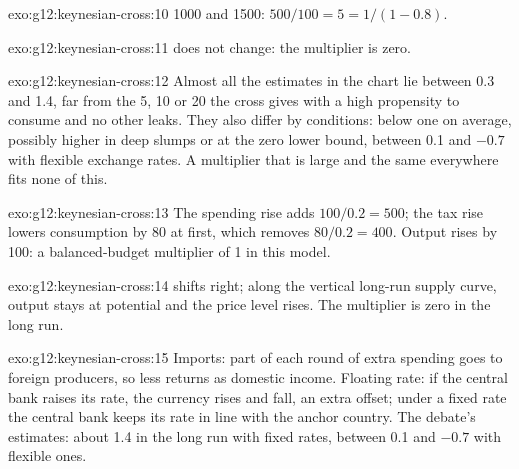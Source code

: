 \begin{solution}{exo:g12:keynesian-cross:10}
1000 and 1500: $500/100 = 5 = 1/(1 - 0.8)$.
\end{solution}

\begin{solution}{exo:g12:keynesian-cross:11}
 does not change: the multiplier is zero.
\end{solution}

\begin{solution}{exo:g12:keynesian-cross:12}
Almost all the estimates in the chart lie between 0.3 and 1.4, far from the 5, 10 or 20 the cross gives with a high propensity to consume and no other leaks. They also
differ by conditions: below one on average, possibly higher in deep slumps or at the zero lower bound, between 0.1 and $-0.7$ with flexible exchange rates. A multiplier
that is large and the same everywhere fits none of this.
\end{solution}

\begin{solution}{exo:g12:keynesian-cross:13}
The spending rise adds $100/0.2 = 500$; the tax rise lowers consumption by 80 at first, which removes $80/0.2 = 400$. Output rises by 100: a balanced-budget multiplier of 1
in this model.
\end{solution}

\begin{solution}{exo:g12:keynesian-cross:14}
 shifts right; along the vertical long-run supply curve, output stays at potential and the price level rises. The multiplier is zero in the long run.
\end{solution}

\begin{solution}{exo:g12:keynesian-cross:15}
Imports: part of each round of extra spending goes to foreign producers, so less returns as domestic income. Floating rate: if the central bank raises its rate, the
currency rises and  fall, an extra offset; under a fixed rate the central bank keeps its rate in line with the anchor country. The debate's estimates: about
1.4 in the long run with fixed rates, between 0.1 and $-0.7$ with flexible ones.
\end{solution}

